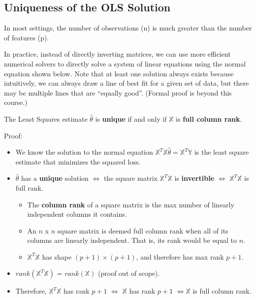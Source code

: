 \documentclass[
  letterpaper,
  DIV=11,
  numbers=noendperiod]{scrreprt}
\providecommand{\tightlist}{%
  \setlength{\itemsep}{0pt}\setlength{\parskip}{0pt}}\usepackage{longtable,booktabs,array}
\begin{document}
\subsection{Uniqueness of the OLS
Solution}\label{uniqueness-of-the-ols-solution}

In most settings, the number of observations (n) is much greater than
the number of features (p).

In practice, instead of directly inverting matrices, we can use more
efficient numerical solvers to directly solve a system of linear
equations using the normal equation shown below. Note that at least one
solution always exists because intuitively, we can always draw a line of
best fit for a given set of data, but there may be multiple lines that
are ``equally good''. (Formal proof is beyond this course.)

The Least Squares estimate \(\hat{\theta}\) is \textbf{unique} if and
only if \(\mathbb{X}\) is \textbf{full column rank}.

\begin{tcolorbox}[enhanced jigsaw, arc=.35mm, colback=white, toprule=.15mm, leftrule=.75mm, bottomrule=.15mm, colframe=quarto-callout-color-frame, rightrule=.15mm, breakable, opacityback=0, left=2mm]

Proof:

\begin{itemize}
\tightlist
\item
  We know the solution to the normal equation
  \(\mathbb{X}^T\mathbb{X}\hat{\theta} = \mathbb{X}^T\mathbb{Y}\) is the
  least square estimate that minimizes the squared loss.
\item
  \(\hat{\theta}\) has a \textbf{unique} solution \(\iff\) the square
  matrix \(\mathbb{X}^T\mathbb{X}\) is \textbf{invertible} \(\iff\)
  \(\mathbb{X}^T\mathbb{X}\) is full rank.

  \begin{itemize}
  \tightlist
  \item
    The \textbf{column rank} of a square matrix is the max number of
    linearly independent columns it contains.
  \item
    An \(n\) x \(n\) square matrix is deemed full column rank when all
    of its columns are linearly independent. That is, its rank would be
    equal to \(n\).
  \item
    \(\mathbb{X}^T\mathbb{X}\) has shape \((p + 1) \times (p + 1)\), and
    therefore has max rank \(p + 1\).
  \end{itemize}
\item
  \(rank(\mathbb{X}^T\mathbb{X})\) = \(rank(\mathbb{X})\) (proof out of
  scope).
\item
  Therefore, \(\mathbb{X}^T\mathbb{X}\) has rank \(p + 1\) \(\iff\)
  \(\mathbb{X}\) has rank \(p + 1\) \(\iff \mathbb{X}\) is full column
  rank.
\end{itemize}

\end{tcolorbox}
\end{document}
